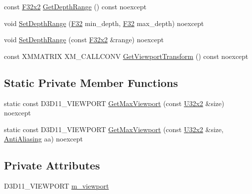 \begin{DoxyCompactItemize}
\item 
const \hyperlink{namespacemage_aa87237ad091f5cd7da612b8523fc108f}{F32x2} \hyperlink{classmage_1_1rendering_1_1_viewport_a50cb4c020709eddb8addb4420a59e1d0}{Get\+Depth\+Range} () const noexcept
\item 
void \hyperlink{classmage_1_1rendering_1_1_viewport_a2dc258c833d225567bba28129c061c2d}{Set\+Depth\+Range} (\hyperlink{namespacemage_aa97e833b45f06d60a0a9c4fc22ae02c0}{F32} min\+\_\+depth, \hyperlink{namespacemage_aa97e833b45f06d60a0a9c4fc22ae02c0}{F32} max\+\_\+depth) noexcept
\item 
void \hyperlink{classmage_1_1rendering_1_1_viewport_a99c76e086ab0db6e9311ab4985d760d6}{Set\+Depth\+Range} (const \hyperlink{namespacemage_aa87237ad091f5cd7da612b8523fc108f}{F32x2} \&range) noexcept
\item 
const X\+M\+M\+A\+T\+R\+IX X\+M\+\_\+\+C\+A\+L\+L\+C\+O\+NV \hyperlink{classmage_1_1rendering_1_1_viewport_ac4ea113f2c019b5b1d369898537ab5c3}{Get\+Viewport\+Transform} () const noexcept
\end{DoxyCompactItemize}
\subsection*{Static Private Member Functions}
\begin{DoxyCompactItemize}
\item 
static const D3\+D11\+\_\+\+V\+I\+E\+W\+P\+O\+RT \hyperlink{classmage_1_1rendering_1_1_viewport_a9a931b51974ac4cd2d93aac2c0e10a09}{Get\+Max\+Viewport} (const \hyperlink{namespacemage_a88e05bff0300120c013285d3dcad95c5}{U32x2} \&size) noexcept
\item 
static const D3\+D11\+\_\+\+V\+I\+E\+W\+P\+O\+RT \hyperlink{classmage_1_1rendering_1_1_viewport_ac971d4f062cf37e3a5a2a57640a13da4}{Get\+Max\+Viewport} (const \hyperlink{namespacemage_a88e05bff0300120c013285d3dcad95c5}{U32x2} \&size, \hyperlink{namespacemage_1_1rendering_ac3f75e49e92b42f2f5fb55c450d8899c}{Anti\+Aliasing} aa) noexcept
\end{DoxyCompactItemize}
\subsection*{Private Attributes}
\begin{DoxyCompactItemize}
\item 
D3\+D11\+\_\+\+V\+I\+E\+W\+P\+O\+RT \hyperlink{classmage_1_1rendering_1_1_viewport_ab0b20f21a771248d9e9659f1029a497d}{m\+\_\+viewport}
\end{DoxyCompactItemize}


